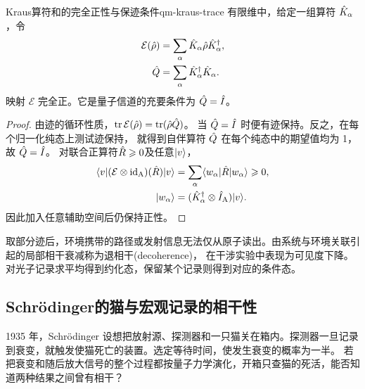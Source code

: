 \begin{theorem}{Kraus算符和的完全正性与保迹条件}{qm-kraus-trace}
    有限维中，给定一组算符 $\hat{K}_\alpha$，令
    \begin{subequations}\label{eq:qm-kraus-channel-criterion}
        \begin{align}
            \mathcal E(\hat{\rho}) &= \sum_\alpha \hat{K}_\alpha\hat{\rho} \hat{K}_\alpha^\dagger,\\
            \hat{Q} &= \sum_\alpha \hat{K}_\alpha^\dagger \hat{K}_\alpha .
        \end{align}
    \end{subequations}
    映射 $\mathcal E$ 完全正。它是量子信道的充要条件为 $\hat{Q} = \hat{I}$。
\end{theorem}
\begin{proof}
    由迹的循环性质，$\operatorname{tr}\mathcal E(\hat{\rho}) = \operatorname{tr}(\hat{\rho} \hat{Q})$。
    当 $\hat{Q} = \hat{I}$ 时便有迹保持。反之，在每个归一化纯态上测试迹保持，
    就得到自伴算符 $\hat{Q}$ 在每个纯态中的期望值均为 1，故 $\hat{Q} = \hat{I}$。
    对联合正算符$\hat{R} \geqslant 0$及任意$\lvert v\rangle$，
    \begin{subequations}
        \begin{align}
            \langle v\vert(\mathcal E \otimes \operatorname{id}_{\mathrm{A}})(\hat{R})\vert v\rangle
            &= \sum_\alpha
            \langle w_\alpha\vert\hat{R}\vert w_\alpha\rangle \geqslant 0,\\
            \lvert w_\alpha\rangle &= (\hat{K}_\alpha^\dagger \otimes \hat{I}_{\mathrm{A}})\lvert v\rangle.
        \end{align}
    \end{subequations}
    因此加入任意辅助空间后仍保持正性。
\end{proof}
取部分迹后，环境携带的路径或发射信息无法仅从原子读出。由系统与环境关联引起的局部相干衰减称为退相干(decoherence)，
在干涉实验中表现为可见度下降。对光子记录求平均得到约化态，保留某个记录则得到对应的条件态。

\subsection{Schrödinger的猫与宏观记录的相干性}
\label{ss:qm-schrodinger-cat}
1935 年，Schrödinger 设想把放射源、探测器和一只猫关在箱内。探测器一旦记录到衰变，就触发使猫死亡的装置。选定等待时间，使发生衰变的概率为一半\cite{schrodinger-cat}。
若把衰变和随后放大信号的整个过程都按量子力学演化，开箱只查猫的死活，能否知道两种结果之间曾有相干？

